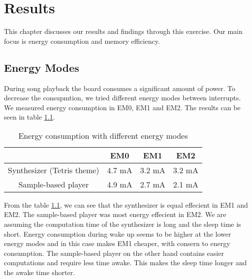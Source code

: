 \chapter{Results}

This chapter discusses our results and findings through this exercise. Our main focus is energy consumption and memory efficiency.


\section{Energy Modes}
\label{sec:energyModeResults}
During song playback the board consumes a significant amount of power. To decrease the consupmtion, we tried different energy modes between interrupts. We measured energy consumption in EM0, EM1 and EM2. The results can be seen in table \ref{tab:benchmarkEnergyModes}.

\begin{table}[H]
	\begin{center}
	\begin{tabular}{ |c|c|c|c| }
	  \hline
	  & EM0 & EM1 & EM2 \\
	  \hline
	  Synthesizer (Tetris theme) & 4.7 mA & 3.2 mA & 3.2 mA \\
	  \hline
	  Sample-based player & 4.9 mA & 2.7 mA & 2.1 mA \\
	  \hline

	\end{tabular}
	\caption{Energy consumption with different energy modes}
	\label{tab:benchmarkEnergyModes}
	\end{center}
\end{table}

From the table \ref{tab:benchmarkEnergyModes}, we can see that the synthesizer is equal effecient in EM1 and EM2. The sample-based player was most energy effecient in EM2. We are assuming the computation time of the synthesizer is long and the sleep time is short. Energy consumption during wake up seems to be higher at the lower energy modes and in this case makes EM1 cheaper, with consern to energy consumption. The sample-based player on the other hand contains easier computations and require less time awake. This makes the sleep time longer and the awake time shorter.

